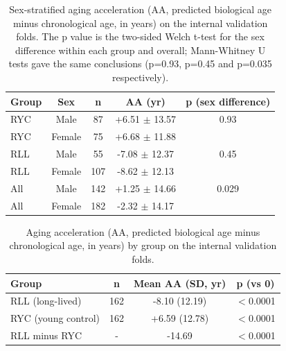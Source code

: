 \documentclass[unnumsec,webpdf,contemporary,large]{oup-authoring-template}
\begin{document}
\begin{table}[htbp]
\caption{Sex-stratified aging acceleration (AA, predicted biological age minus chronological age, in years) on the internal validation folds. The p value is the two-sided Welch t-test for the sex difference within each group and overall; Mann-Whitney U tests gave the same conclusions (p=0.93, p=0.45 and p=0.035 respectively).}
\label{tab:aasex}
\begin{center}
\begin{tabular}{lcccc}
\hline
Group & Sex & n & AA (yr) & p (sex difference) \\
\hline
RYC & Male & 87 & +6.51 $\pm$ 13.57 & 0.93 \\
RYC & Female & 75 & +6.68 $\pm$ 11.88 & \\
RLL & Male & 55 & -7.08 $\pm$ 12.37 & 0.45 \\
RLL & Female & 107 & -8.62 $\pm$ 12.13 & \\
All & Male & 142 & +1.25 $\pm$ 14.66 & 0.029 \\
All & Female & 182 & -2.32 $\pm$ 14.17 & \\
\hline
\end{tabular}
\end{center}
\end{table}

\begin{table}[htbp]
\caption{Aging acceleration (AA, predicted biological age minus chronological age, in years) by group on the internal validation folds.}
\label{tab:aa}
\begin{center}
\begin{tabular}{lccc}
\hline
Group & n & Mean AA (SD, yr) & p (vs 0) \\
\hline
RLL (long-lived) & 162 & -8.10 (12.19) & $<$0.0001 \\
RYC (young control) & 162 & +6.59 (12.78) & $<$0.0001 \\
RLL minus RYC & - & -14.69 & $<$0.0001 \\
\hline
\end{tabular}
\end{center}
\end{table}
\end{document}
